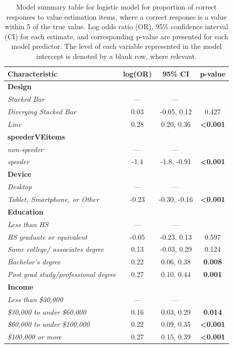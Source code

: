 \documentclass{IEEEcsmag}
\begin{document}
\begin{table}
\label{vemodeltable}
\caption{Model summary table for logistic model for proportion of correct responses to value estimation items, where a correct response is a value within 5 of the true value. Log odds ratio (OR), 95\% confidence interval (CI) for each estimate, and corresponding p-value are presented for each model predictor. The level of each variable represented in the model intercept is denoted by a blank row, where relevant.}

\begin{tabular}{lccc}
\toprule
\textbf{Characteristic} & \textbf{log(OR)} & \textbf{95\% CI} & \textbf{p-value}\\
\midrule
\textbf{Design} &  &  & \\
\textit{Stacked Bar} & — & — & \\
\textit{Diverging Stacked Bar} & 0.03 & -0.05, 0.12 & 0.427\\
\textit{Line} & 0.28 & 0.20, 0.36 & \textbf{<0.001}\\
\textbf{speederVEitems} &  &  & \\\textit{non-speeder} & — & — & \\
\textit{speeder} & -1.4 & -1.8, -0.91 & \textbf{<0.001}\\
\textbf{Device} &  &  & \\
\textit{Desktop} & — & — & \\
\textit{Tablet, Smartphone, or Other} & -0.23 & -0.30, -0.16 & \textbf{<0.001}\\\textbf{Education} &  &  & \\
\textit{Less than HS} & — & — & \\
\textit{HS graduate or equivalent} & -0.05 & -0.23, 0.13 & 0.597\\
\textit{Some college/ associates degree} & 0.13 & -0.03, 0.29 & 0.124\\
\textit{Bachelor's degree} & 0.22 & 0.06, 0.38 & \textbf{0.008}\\\textit{Post grad study/professional degree} & 0.27 & 0.10, 0.44 & \textbf{0.001}\\
\textbf{Income} &  &  & \\
\textit{Less than \$30,000} & — & — & \\
\textit{\$30,000 to under \$60,000} & 0.16 & 0.03, 0.29 & \textbf{0.014}\\
\textit{\$60,000 to under \$100,000} & 0.22 & 0.09, 0.35 & \textbf{<0.001}\\\textit{\$100,000 or more} & 0.27 & 0.15, 0.39 & \textbf{<0.001}\\

\end{tabular}
\end{table}
\end{document}
